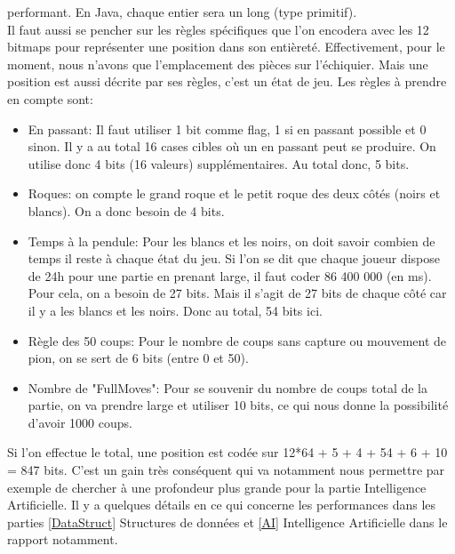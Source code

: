 \documentclass{article}
\begin{document}
performant. En Java, chaque entier sera un long (type primitif).
\\Il faut aussi se pencher sur les règles spécifiques que l'on encodera avec les 12 bitmaps pour représenter une position
dans son entièreté. Effectivement, pour le moment, nous n'avons que l'emplacement des pièces sur l'échiquier. Mais une position
est aussi décrite par ses règles, c'est un état de jeu. Les règles à prendre en compte sont:\\
\begin{itemize}
    \item En passant: Il faut utiliser 1 bit comme flag, 1 si en passant possible et 0 sinon. Il y a au total 16 cases cibles où
    un en passant peut se produire. On utilise donc 4 bits (16 valeurs) supplémentaires. Au total donc, 5 bits.
    \item Roques: on compte le grand roque et le petit roque des deux côtés (noirs et blancs). On a donc besoin de 4 bits.
    \item Temps à la pendule: Pour les blancs et les noirs, on doit savoir combien de temps il reste à chaque état du jeu. Si
    l'on se dit que chaque joueur dispose de 24h pour une partie en prenant large, il faut coder 86 400 000 (en ms). Pour cela,
    on a besoin de 27 bits. Mais il s'agit de 27 bits de chaque côté car il y a les blancs et les noirs. Donc au total, 54 bits ici.
    \item Règle des 50 coups: Pour le nombre de coups sans capture ou mouvement de pion, on se sert de 6 bits (entre 0 et 50).
    \item Nombre de "FullMoves": Pour se souvenir du nombre de coups total de la partie, on va prendre large et utiliser 10 bits,
    ce qui nous donne la possibilité d'avoir 1000 coups.\\
\end{itemize}

Si l'on effectue le total, une position est codée sur 12*64 + 5 + 4 + 54 + 6 + 10 = 847 bits.
C'est un gain très conséquent qui va notamment nous permettre par exemple de chercher à une profondeur plus grande pour la partie
Intelligence Artificielle. Il y a quelques détails en ce qui concerne les performances dans les parties \ref{DataStruct} Structures de données et
\ref{AI} Intelligence Artificielle dans le rapport notamment.
\end{document}
